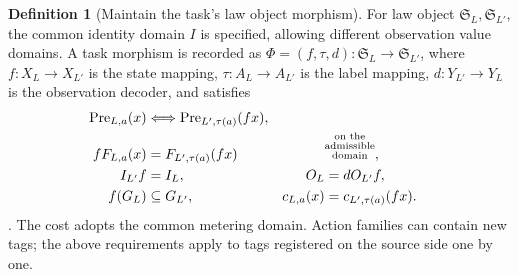 \documentclass[12pt,a4paper,openany,notitlepage]{report}
\theoremstyle{plain}
\theoremstyle{definition}
\newtheorem{definition}[theorem]{Definition}
\theoremstyle{remark}
\def\mathcal#1{#1}\def\mathsf#1{#1}\def\mathbb#1{#1}%
\begin{document}
\begin{CJK*}
\begin{definition}
[Maintain the task's law object morphism]\label{exp:law:morphism}
For law object $\mathfrak S_L,\mathfrak S_{L'}$, the common identity domain $\mathcal I$ is specified, allowing different observation value domains. A task morphism is recorded as $\Phi=(f,\tau,d):\mathfrak S_L\to\mathfrak S_{L'}$, where $f:X_L\to X_{L'}$ is the state mapping, $\tau:A_L\to A_{L'}$ is the label mapping, $d:Y_{L'}\to Y_L$ is the observation decoder, and satisfies \[
 \begin{aligned}
 \operatorname{Pre}_{L,a}(x)
 &\Longleftrightarrow\operatorname{Pre}_{L',\tau(a)}(f x),\\
 fF_{L,a}(x)&=F_{L',\tau(a)}(fx)
 &&\text{\shortstack[c]{\scriptsize on the\\[-1pt]\scriptsize admissible\\[-1pt]\scriptsize domain}},\\
 I_{L'}f&=I_L,& O_L&=dO_{L'}f,\\
 f(G_L)&\subseteq G_{L'},&
 c_{L,a}(x)&=c_{L',\tau(a)}(fx).
 \end{aligned}
\]. The cost adopts the common metering domain. Action families can contain new tags; the above requirements apply to tags registered on the source side one by one.\end{definition}



\end{CJK*}
\end{document}

